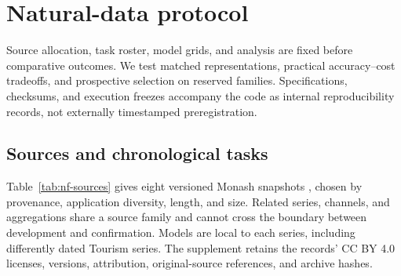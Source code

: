 \section{Natural-data protocol}
\label{sec:nf-protocol}

Source allocation, task roster, model grids, and analysis are fixed before
comparative outcomes.  We test matched representations, practical accuracy--cost
tradeoffs, and prospective selection on reserved families.  Specifications,
checksums, and execution freezes accompany the code as internal reproducibility
records, not externally timestamped preregistration.

\subsection{Sources and chronological tasks}
\label{sec:nf-data}

Table~\ref{tab:nf-sources} gives eight versioned Monash snapshots
\citep{Godahewa2021Monash}, chosen by provenance, application diversity, length,
and size.  Related series, channels, and aggregations share a source family
and cannot cross the boundary between development and confirmation.  Models are local to
each series, including differently dated Tourism series.  The supplement
retains the records' CC BY 4.0 licenses, versions, attribution, original-source
references, and archive hashes.

